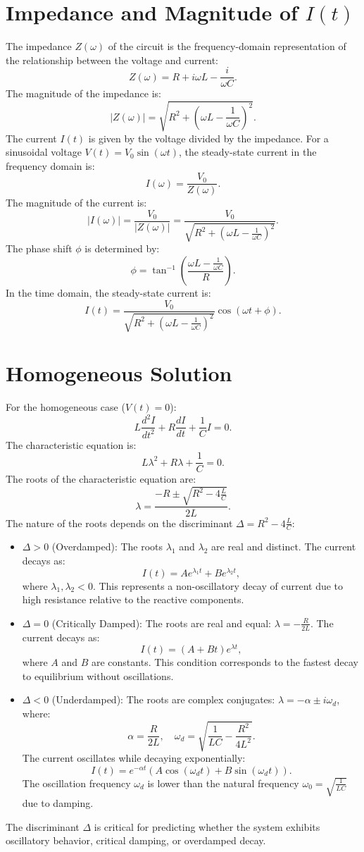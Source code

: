 \documentclass[a4paper,11pt]{article}
\begin{document}
\section*{Impedance and Magnitude of \(I(t)\)}
The impedance \(Z(\omega)\) of the circuit is the frequency-domain representation of the relationship between the voltage and current:
\[
Z(\omega) = R + i\omega L - \frac{i}{\omega C}.
\]
The magnitude of the impedance is:
\[
|Z(\omega)| = \sqrt{R^2 + \left(\omega L - \frac{1}{\omega C}\right)^2}.
\]
The current \(I(t)\) is given by the voltage divided by the impedance. For a sinusoidal voltage \(V(t) = V_0 \sin(\omega t)\), the steady-state current in the frequency domain is:
\[
I(\omega) = \frac{V_0}{Z(\omega)}.
\]
The magnitude of the current is:
\[
|I(\omega)| = \frac{V_0}{|Z(\omega)|} = \frac{V_0}{\sqrt{R^2 + \left(\omega L - \frac{1}{\omega C}\right)^2}}.
\]
The phase shift \(\phi\) is determined by:
\[
\phi = \tan^{-1}\left(\frac{\omega L - \frac{1}{\omega C}}{R}\right).
\]
In the time domain, the steady-state current is:
\[
I(t) = \frac{V_0}{\sqrt{R^2 + \left(\omega L - \frac{1}{\omega C}\right)^2}} \cos(\omega t + \phi).
\]

\section*{Homogeneous Solution}
For the homogeneous case (\(V(t) = 0\)):
\[
L \frac{d^2I}{dt^2} + R \frac{dI}{dt} + \frac{1}{C} I = 0.
\]
The characteristic equation is:
\[
L\lambda^2 + R\lambda + \frac{1}{C} = 0.
\]
The roots of the characteristic equation are:
\[
\lambda = \frac{-R \pm \sqrt{R^2 - 4\frac{L}{C}}}{2L}.
\]
The nature of the roots depends on the discriminant \(\Delta = R^2 - 4\frac{L}{C}\):
\begin{itemize}
    \item \(\Delta > 0\) (Overdamped): The roots \(\lambda_1\) and \(\lambda_2\) are real and distinct. The current decays as:
    \[
    I(t) = A e^{\lambda_1 t} + B e^{\lambda_2 t},
    \]
    where \(\lambda_1, \lambda_2 < 0\). This represents a non-oscillatory decay of current due to high resistance relative to the reactive components.
    \item \(\Delta = 0\) (Critically Damped): The roots are real and equal: \(\lambda = -\frac{R}{2L}\). The current decays as:
    \[
    I(t) = (A + Bt)e^{\lambda t},
    \]
    where \(A\) and \(B\) are constants. This condition corresponds to the fastest decay to equilibrium without oscillations.
    \item \(\Delta < 0\) (Underdamped): The roots are complex conjugates: \(\lambda = -\alpha \pm i\omega_d\), where:
    \[
    \alpha = \frac{R}{2L}, \quad \omega_d = \sqrt{\frac{1}{LC} - \frac{R^2}{4L^2}}.
    \]
    The current oscillates while decaying exponentially:
    \[
    I(t) = e^{-\alpha t} \left(A \cos(\omega_d t) + B \sin(\omega_d t)\right).
    \]
    The oscillation frequency \(\omega_d\) is lower than the natural frequency \(\omega_0 = \sqrt{\frac{1}{LC}}\) due to damping.
\end{itemize}
The discriminant \(\Delta\) is critical for predicting whether the system exhibits oscillatory behavior, critical damping, or overdamped decay.
\end{document}
